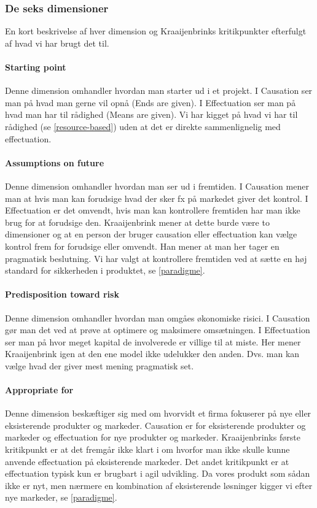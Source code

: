 \subsubsection{De seks dimensioner}
En kort beskrivelse af hver dimension og Kraaijenbrinks kritikpunkter efterfulgt af hvad vi har brugt det til.

\paragraph{Starting point}
Denne dimension omhandler hvordan man starter ud i et projekt.
I Causation ser man på hvad man gerne vil opnå (Ends are given).
I Effectuation ser man på hvad man har til rådighed (Means are given).
Vi har kigget på hvad vi har til rådighed (se \cref{resource-based}) uden at det er direkte sammenlignelig med effectuation.

\paragraph{Assumptions on future}
Denne dimension omhandler hvordan man ser ud i fremtiden.
I Causation mener man at hvis man kan forudsige hvad der sker fx på markedet giver det kontrol.
I Effectuation er det omvendt, hvis man kan kontrollere fremtiden har man ikke brug for at forudsige den.
Kraaijenbrink mener at dette burde være to dimensioner og at en person der bruger causation eller effectuation kan vælge kontrol frem for forudsige eller omvendt.
Han mener at man her tager en pragmatisk beslutning.
Vi har valgt at kontrollere fremtiden ved at sætte en høj standard for sikkerheden i produktet, se \cref{paradigme}.

\paragraph{Predisposition toward risk}
Denne dimension omhandler hvordan man omgåes økonomiske risici.
I Causation gør man det ved at prøve at optimere og maksimere omsætningen.
I Effectuation ser man på hvor meget kapital de involverede er villige til at miste.
Her mener Kraaijenbrink igen at den ene model ikke udelukker den anden.
Dvs. man kan vælge hvad der giver mest mening pragmatisk set.

\paragraph{Appropriate for}
Denne dimension beskæftiger sig med om hvorvidt et firma fokuserer på nye eller eksisterende produkter og markeder.
Causation er for eksisterende produkter og markeder og effectuation for nye produkter og markeder.
Kraaijenbrinks første kritikpunkt er at det fremgår ikke klart i \citet{sarasvathy2001effectuation} om hvorfor man ikke skulle kunne anvende effectuation på eksisterende markeder.
Det andet kritikpunkt er at effectuation typisk kun er brugbart i agil udvikling.
Da vores produkt som sådan ikke er nyt, men nærmere en kombination af eksisterende løsninger kigger vi efter nye markeder, se \cref{paradigme}.

